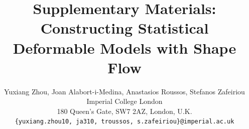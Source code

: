 






\title{Supplementary Materials: Constructing Statistical Deformable Models with Shape Flow}

\author{Yuxiang Zhou, Joan Alabort-i-Medina, Anastasios Roussos, Stefanos Zafeiriou\\
Imperial College London\\
180 Queen’s Gate, SW7 2AZ, London, U.K.\\
{\tt\small \{yuxiang.zhou10, ja310, troussos, s.zafeiriou\}@imperial.ac.uk}}
\maketitle
\thispagestyle{empty}

